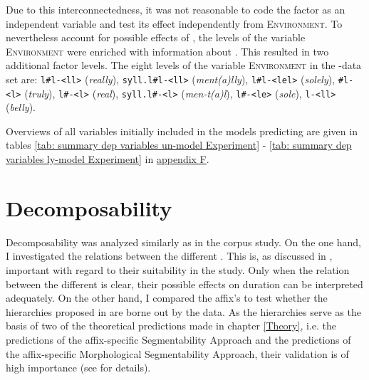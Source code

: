  Due to this interconnectedness, it was not reasonable to code the factor  as an independent variable and test its effect independently from \textsc{Environment}. 
 To nevertheless account for possible effects of , the levels of the variable \textsc{Environment} were enriched with information about . 
This resulted in two additional factor levels.
   The eight levels of the variable \textsc{Environment} in the -data set are: \texttt{l\#l-<ll>} (\textit{really}), \texttt{syll.l\#l-<ll>} (\textit{ment(a)lly}), \texttt{l\#l-<lel>} (\textit{solely}), \texttt{\#l-<l>} (\textit{truly}), \texttt{l\#-<l>} (\textit{real}), \texttt{syll.l\#-<l>} (\textit{men-t(a)l}),  \texttt{l\#-<le>} (\textit{sole}), \texttt{l-<ll> }(\textit{belly}). 		

Overviews of all variables initially included in the models predicting  are given in tables \ref{tab: summary dep variables un-model Experiment} - \ref{tab: summary dep variables ly-model Experiment} in \hyperref[Appendix F Summaries of variables in initial models of experimental study]{appendix F}.



\section{Decomposability} \label{decomposability experiment}


 

Decomposability was analyzed similarly as in the corpus study. On the one hand, I investigated the relations between the different . This is, as discussed in , important with regard to their suitability in the study. Only when the relation between the different  is clear, their possible effects on duration can be interpreted adequately.  
On the other hand, I compared the affix's  to test whether the  hierarchies proposed in  are borne out by the data.  As the hierarchies serve as the basis of two of the theoretical predictions made in chapter \ref{Theory}, i.e. the predictions of the affix-specific Segmentability Approach and the predictions of the affix-specific Morphological Segmentability Approach, their validation is of high importance (see  for details). 




